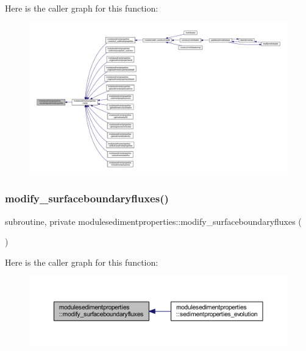 Here is the caller graph for this function\+:\nopagebreak
\begin{figure}[H]
\begin{center}
\leavevmode
\includegraphics[width=350pt]{namespacemodulesedimentproperties_a8bdf617b0165523af238758f5b5a5767_icgraph}
\end{center}
\end{figure}
\mbox{\label{namespacemodulesedimentproperties_a747aaf088749f649d9ca7c244a31c529}} 
\subsubsection{\texorpdfstring{modify\+\_\+surfaceboundaryfluxes()}{modify\_surfaceboundaryfluxes()}}
{\footnotesize\ttfamily subroutine, private modulesedimentproperties\+::modify\+\_\+surfaceboundaryfluxes (\begin{DoxyParamCaption}{ }\end{DoxyParamCaption})\hspace{0.3cm}{\ttfamily [private]}}

Here is the caller graph for this function\+:\nopagebreak
\begin{figure}[H]
\begin{center}
\leavevmode
\includegraphics[width=350pt]{namespacemodulesedimentproperties_a747aaf088749f649d9ca7c244a31c529_icgraph}
\end{center}
\end{figure}
\mbox{\label{namespacemodulesedimentproperties_a53b69fba92a04f1c26ee8ee39794357d}} 
